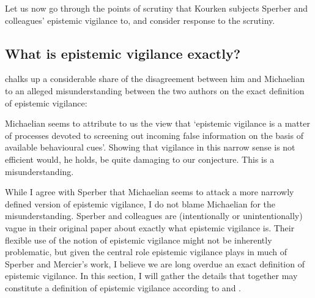  Let us now go through the points of scrutiny that Kourken \citet{Michaelian13} subjects Sperber and colleagues' epistemic vigilance to, and consider  response to the scrutiny.

\subsection{What is epistemic vigilance exactly?}


\citet{Sperber13} chalks up a considerable share of the disagreement between him and Michaelian to an alleged misunderstanding between the two authors on the exact definition of epistemic vigilance:
\begin{quoting}
    Michaelian seems to attribute to us the view that ‘epistemic vigilance is a matter of processes devoted to screening out incoming false information on the basis of available behavioural cues’. Showing that vigilance in this narrow sense is not efficient would, he holds, be quite damaging to our conjecture. This is a misunderstanding.
    \hfill \citep[p.~65]{Sperber13}
\end{quoting}
While I agree with Sperber that Michaelian seems to attack a more narrowly defined version of epistemic vigilance, I do not blame Michaelian for the misunderstanding. Sperber and colleagues are (intentionally or unintentionally) vague in their original paper about exactly what epistemic vigilance is.
Their flexible use of the notion of epistemic vigilance might not be inherently problematic, but given the central role epistemic vigilance plays in much of Sperber and Mercier's work, I believe we are long overdue an exact definition of epistemic vigilance. In this section, I will gather the details that together may constitute a definition of epistemic vigilance according to \citet{Sperber10} and \citet{Sperber13}.

